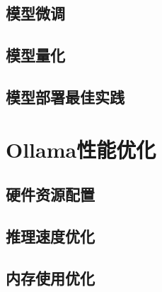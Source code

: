 \documentclass[12pt,UTF8]{ctexbook}
\begin{document}
\section{模型微调}
\section{模型量化}
\section{模型部署最佳实践}

\chapter{Ollama性能优化}
\section{硬件资源配置}
\section{推理速度优化}
\section{内存使用优化}

\backmatter
\end{document}
